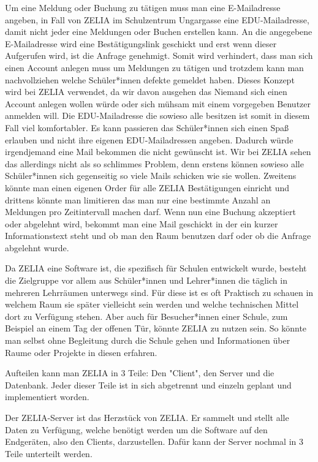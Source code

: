 Um eine Meldung oder Buchung zu tätigen muss man eine E-Mailadresse angeben, in Fall von ZELIA im Schulzentrum Ungargasse eine EDU-Mailadresse, damit nicht jeder eine Meldungen oder Buchen erstellen kann. An die angegebene E-Mailadresse wird eine Bestätigungslink geschickt und erst wenn dieser Aufgerufen wird, ist die Anfrage genehmigt. Somit wird verhindert, dass man sich einen Account anlegen muss um Meldungen zu tätigen und trotzdem kann man nachvollziehen welche Schüler*innen defekte gemeldet haben. Dieses Konzept wird bei ZELIA verwendet, da wir davon ausgehen das Niemand sich einen Account anlegen wollen würde oder sich mühsam mit einem vorgegeben Benutzer anmelden will. Die EDU-Mailadresse die sowieso alle besitzen ist somit in diesem Fall viel komfortabler. Es kann passieren das Schüler*innen sich einen Spaß erlauben und nicht ihre eigenen EDU-Mailadressen angeben. Dadurch würde irgendjemand eine Mail bekommen die nicht gewünscht ist. Wir bei ZELIA sehen das allerdings nicht als so schlimmes Problem, denn erstens können sowieso alle Schüler*innen sich gegenseitig so viele Mails schicken wie sie wollen. Zweitens könnte man einen eigenen Order für alle ZELIA Bestätigungen einricht
und drittens könnte man limitieren das man nur eine bestimmte Anzahl an Meldungen pro Zeitintervall machen darf. Wenn nun eine Buchung akzeptiert oder abgelehnt wird, bekommt man eine Mail geschickt in der ein kurzer Informationstext steht und ob man den Raum benutzen darf oder ob die Anfrage abgelehnt wurde.

Da ZELIA eine Software ist, die spezifisch für Schulen entwickelt wurde, besteht die Zielgruppe vor allem aus Schüler*innen und Lehrer*innen die täglich in mehreren Lehrräumen unterwegs sind. Für diese ist es oft Praktisch zu schauen in welchem Raum sie später vielleicht sein werden und welche technischen Mittel dort zu Verfügung stehen. Aber auch für Besucher*innen einer Schule, zum Beispiel an einem Tag der offenen Tür, könnte ZELIA zu nutzen sein. So könnte man selbst ohne Begleitung durch die Schule gehen und Informationen über Raume oder Projekte in diesen erfahren.

Aufteilen kann man ZELIA in 3 Teile: Den "Client", den Server und die Datenbank. Jeder dieser Teile ist in sich abgetrennt und einzeln geplant und implementiert worden.


Der ZELIA-Server ist das Herzstück von ZELIA. Er sammelt und stellt alle Daten zu Verfügung, welche benötigt werden um die Software auf den Endgeräten, also den Clients, darzustellen. Dafür kann der Server nochmal in 3 Teile unterteilt werden.

